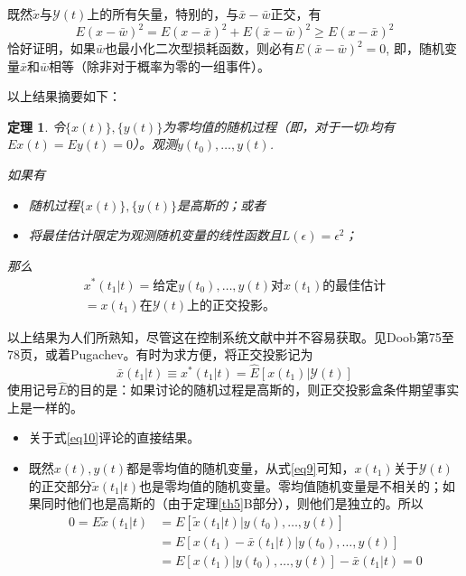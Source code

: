 \documentclass[UTF8,adobefonts]{ctexart}
\newtheorem{theorem}{定理}
\begin{document}
既然$\tilde{x}$与$\mathbf{\mathcal{Y}}(t)$上的所有矢量，特别的，与$\bar{x}-\bar{w}$正交，有
\begin{equation}
\label{eq10}
E(x-\bar{w})^2=E(x-\bar{x})^2+E(\bar{x}-\bar{w})^2 \ge E(x-\bar{x})^2
\end{equation}
恰好证明，如果$\bar{w}$也最小化二次型损耗函数，则必有$E(\bar{x}-\bar{w})^2=0$, 即，随机变量$\bar{x}$和$\bar{w}$相等（除非对于概率为零的一组事件）。

以上结果摘要如下：
\begin{theorem}
\label{th2}
令$\{x(t)\},\{y(t)\}$为零均值的随机过程（即，对于一切$t$均有$Ex(t)=Ey(t)=0$）。观测$y(t_0),\dotsc,y(t)$.

如果有
\begin{itemize}
\item[A] 随机过程$\{x(t)\},\{y(t)\}$是高斯的；或者
\item[B] 将最佳估计限定为观测随机变量的线性函数且$L(\epsilon)=\epsilon^2$；
\end{itemize}
那么
\begin{multline}
\label{eq11}
x^\ast (t_1 \vert t)=\text{给定}y(t_0),\dotsc,y(t)\text{对}x(t_1)\text{的最佳估计}\\
=x(t_1)\text{在}\mathbf{\mathcal{Y}}(t)\text{上的正交投影}。
\end{multline}
\end{theorem}

以上结果为人们所熟知，尽管这在控制系统文献中并不容易获取。见Doob\cite{rf15}第75至78页，或着Pugachev\cite{rf26}。有时为求方便，将正交投影记为
\begin{equation*}
\bar{x}(t_1 \vert t) \equiv x^\ast (t_1 \vert t)=\hat{E}[x(t_1) \vert \mathbf{\mathcal{Y}}(t)]
\end{equation*}
使用记号$\hat{E}$的目的是：如果讨论的随机过程是高斯的，则正交投影盒条件期望事实上是一样的。

{}
\begin{itemize}
\item[A] 关于式\ref{eq10}评论的直接结果。
\item[B] 既然$x(t),y(t)$都是零均值的随机变量，从式\ref{eq9}可知，$x(t_1)$关于$\mathbf{\mathcal{Y}}(t)$的正交部分$\tilde{x}(t_1 \vert t)$也是零均值的随机变量。零均值随机变量是不相关的；如果同时他们也是高斯的（由于定理\ref{th5}B部分），则他们是独立的。所以
\begin{equation*}
\begin{split}
0=E\tilde{x}(t_1 \vert t)&=E[\tilde{x}(t_1 \vert t)\vert y(t_0),\dotsc,y(t)]\\
&=E[x(t_1) - \bar{x}(t_1 \vert t)\vert y(t_0),\dotsc,y(t)]\\
&=E[x(t_1)\vert y(t_0),\dotsc,y(t)]-\bar{x}(t_1 \vert t)=0
\end{split}
\end{equation*}
\end{itemize}
\end{document}
